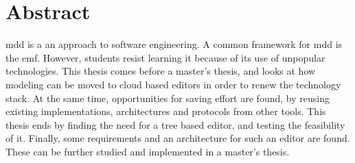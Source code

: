 \chapter*{Abstract}

\Acrlong{mdd} is a an approach to software engineering.
A common framework for \gls{mdd} is the \acrlong{emf}.
However, students resist learning it because of its use of unpopular technologies.
This thesis comes before a master's thesis, and looks at how modeling can be moved to cloud based editors in order to renew the technology stack.
At the same time, opportunities for saving effort are found, by reusing existing implementations, architectures and protocols from other tools.
This thesis ends by finding the need for a tree based editor, and testing the feasibility of it.
Finally, some requirements and an architecture for such an editor are found.
These can be further studied and implemented in a master's thesis.